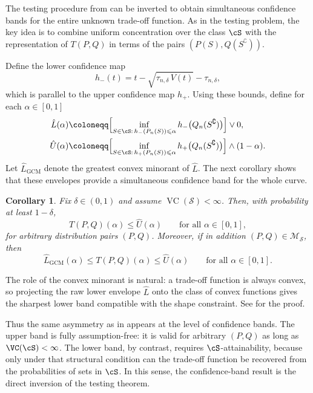 \documentclass[english]{article}
\theoremstyle{plain}
\newtheorem{corollary}{Corollary}[section]
\theoremstyle{definition}
\newcommand{\Toff}[2]{T(#1,#2)}
\newcommand{\tauND}{\tau_{n,\delta}}               %
\newcommand{\hup}{h_+}                             %
\begin{document}
The testing procedure from  can be inverted to obtain
simultaneous confidence bands for the entire unknown trade-off function. As in
the testing problem, the key idea is to combine uniform concentration over the
class \(\cS\) with the representation of \(\Toff{P}{Q}\) in terms of the pairs
\((P(S),Q(S^\complement))\).

Define the lower confidence map
\[
h_-(t)=t-\sqrt{\tauND\,V(t)}-\tauND,
\]
which is parallel to the upper confidence map $\hup$.
Using these bounds, define for each \(\alpha\in[0,1]\)
\begin{align*}
\hat L(\alpha)
&\coloneqq
\Bigl[
\inf_{S\in\cS:\, h_-(P_n(S))\leqslant \alpha}
h_-\bigl(Q_n(S^\complement)\bigr)
\Bigr]\vee 0,\\
\hat U(\alpha)
&\coloneqq
\Bigl[
\inf_{S\in\cS:\, h_+(P_n(S))\leqslant \alpha}
h_+\bigl(Q_n(S^\complement)\bigr)
\Bigr]\wedge (1-\alpha).
\end{align*}
Let \(\hat L_{\mathrm{GCM}}\) denote the greatest convex minorant of \(\hat L\).
The next corollary shows that these envelopes provide a simultaneous
confidence band for the whole curve.

\begin{corollary}\label{cor:confidence-bands}
Fix \(\delta\in(0,1)\) and assume \(\operatorname{VC}(\mathcal S)<\infty\).
Then, with probability at least \(1-\delta\),
\[
\Toff{P}{Q}(\alpha) \leqslant \hat U(\alpha)
\qquad
\text{for all }\alpha\in[0,1],
\]
for arbitrary distribution pairs \((P,Q)\). Moreover, if in addition
\((P,Q)\in\mathcal M_{\mathcal S}\), then
\[
\hat L_{\mathrm{GCM}}(\alpha)
\leqslant
\Toff{P}{Q}(\alpha)
\leqslant
\hat U(\alpha)
\qquad
\text{for all }\alpha\in[0,1].
\]
\end{corollary}

\noindent The role of the convex minorant is natural: a trade-off function is
always convex, so projecting the raw lower envelope \(\hat L\) onto the class
of convex functions gives the sharpest lower band compatible with the shape
constraint. See  for the proof.
\medskip

Thus the same asymmetry as in  appears at the level of
confidence bands. The upper band is fully assumption-free: it is valid for
arbitrary \((P,Q)\) as long as \(\VC(\cS)<\infty\). The lower band, by
contrast, requires \(\cS\)-attainability, because only under that structural
condition can the trade-off function be recovered from the probabilities of
sets in \(\cS\). In this sense, the confidence-band result is the direct
inversion of the testing theorem.
\end{document}
